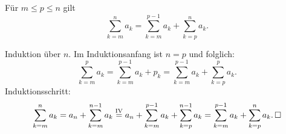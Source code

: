 \begin{Korollar}
Für $m\le p\le n$ gilt
\[\sum_{k=m}^n a_k = \sum_{k=m}^{p-1} a_k + \sum_{k=p}^n a_k.\]
\end{Korollar}
\begin{Beweis} Induktion über $n$. Im Induktionsanfang ist $n=p$
und folglich:
\[\sum_{k=m}^p a_k = \sum_{k=m}^{p-1} a_k + p_k
= \sum_{k=m}^{p-1} a_k + \sum_{k=p}^p a_k.\]
Induktionsschritt:
\[\sum_{k=m}^n a_k = a_n + \sum_{k=m}^{n-1} a_k
\stackrel{\mathrm{IV}}= a_n + \sum_{k=m}^{p-1} a_k + \sum_{k=p}^{n-1} a_k
= \sum_{k=m}^{p-1} a_k + \sum_{k=p}^n a_k.\,\square
\]
\end{Beweis}
